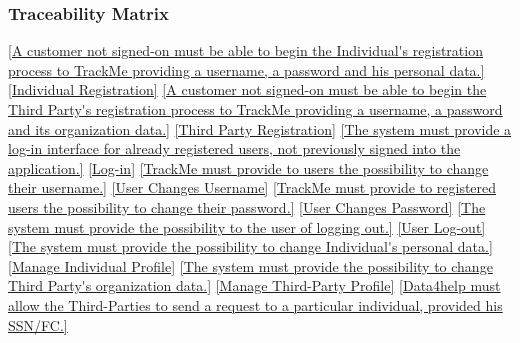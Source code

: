 \documentclass[a4paper]{article}
\begin{document}
        \subsubsection{Traceability Matrix}
        \begin{traceabilitymatrix}
            \con{\ref{Allow a Guest to register as an Individual.}}
                {\ref{A customer not signed-on must be able to begin the Individual's registration process to TrackMe providing a username, a password and his personal data.}}
                {\ref{Individual Registration}}
                {}
            \con{\ref{Allow a Guest to register as an Third-Party.}}
                {\ref{A customer not signed-on must be able to begin the Third Party's registration process to TrackMe providing a username, a password and its organization data.}}
                {\ref{Third Party Registration}}
                {}
            \con{\ref{The Guest should be able to sign in into the application.}}
                {\ref{The system must provide a log-in interface for already registered users, not previously signed into the application.}}
                {\ref{Log-in}}
                {}
            \con{\ref{The User should be able to change his username.}}
                {\ref{TrackMe must provide to users the possibility to change their username.}}
                {\ref{User Changes Username}}
                {}
            \con{\ref{The User should be able to change his password.}}
                {\ref{TrackMe must provide to registered users the possibility to change their password.}}
                {\ref{User Changes Password}}
                {}
            \con{\ref{The User should be able to log-out from the system.}}
                {\ref{The system must provide the possibility to the user of logging out.}}
                {\ref{User Log-out}}
                {}
            \con{\ref{The Individual should be able to change his personal data.}}
                {\ref{The system must provide the possibility to change Individual's personal data.}}
                {\ref{Manage Individual Profile}}
                {}
            \con{\ref{The Third-Party should be able to change his organization data.}}
                {\ref{The system must provide the possibility to change Third Party's organization data.}}
                {\ref{Manage Third-Party Profile}}
                {}
            \con{\ref{The Third-Party should be able to send requests to the Individuals.}}
                {\ref{Data4help must allow the Third-Parties to send a request to a particular individual, provided his SSN/FC.}}

\end{traceabilitymatrix}
\end{document}
